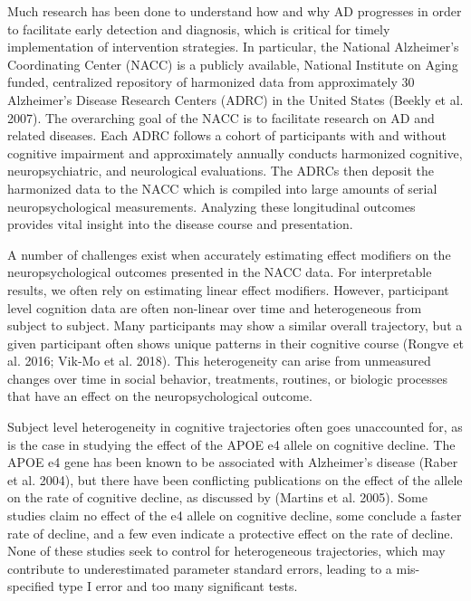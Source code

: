 \documentclass[
]{article}
\begin{document}
Much research has been done to understand how and why AD progresses in order to facilitate early detection and diagnosis, which is critical for timely implementation of intervention strategies. In particular, the National Alzheimer's Coordinating Center (NACC) is a publicly available, National Institute on Aging funded, centralized repository of harmonized data from approximately 30 Alzheimer's Disease Research Centers (ADRC) in the United States (Beekly et al. 2007). The overarching goal of the NACC is to facilitate research on AD and related diseases. Each ADRC follows a cohort of participants with and without cognitive impairment and approximately annually conducts harmonized cognitive, neuropsychiatric, and neurological evaluations. The ADRCs then deposit the harmonized data to the NACC which is compiled into large amounts of serial neuropsychological measurements. Analyzing these longitudinal outcomes provides vital insight into the disease course and presentation.

A number of challenges exist when accurately estimating effect modifiers on the neuropsychological outcomes presented in the NACC data. For interpretable results, we often rely on estimating linear effect modifiers. However, participant level cognition data are often non-linear over time and heterogeneous from subject to subject. Many participants may show a similar overall trajectory, but a given participant often shows unique patterns in their cognitive course (Rongve et al. 2016; Vik‐Mo et al. 2018). This heterogeneity can arise from unmeasured changes over time in social behavior, treatments, routines, or biologic processes that have an effect on the neuropsychological outcome.

Subject level heterogeneity in cognitive trajectories often goes unaccounted for, as is the case in studying the effect of the APOE e4 allele on cognitive decline. The APOE e4 gene has been known to be associated with Alzheimer's disease (Raber et al. 2004), but there have been conflicting publications on the effect of the allele on the rate of cognitive decline, as discussed by (Martins et al. 2005). Some studies claim no effect of the e4 allele on cognitive decline, some conclude a faster rate of decline, and a few even indicate a protective effect on the rate of decline. None of these studies seek to control for heterogeneous trajectories, which may contribute to underestimated parameter standard errors, leading to a mis-specified type I error and too many significant tests.
\end{document}

